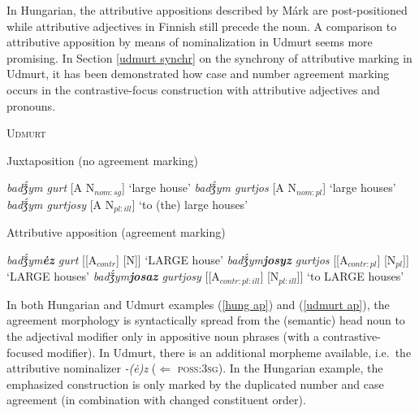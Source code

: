 {In Hungarian, the attributive appositions described by Márk are post-positioned while attributive adjectives in Finnish still precede the noun. A comparison to attributive apposition by means of nominalization in Udmurt seems more promising. In Section \ref{udmurt synchr} on the synchrony of attributive marking in Udmurt, it has been demonstrated how case and number agreement marking occurs in the contrastive-focus construction with attributive adjectives and pronouns.
\begin{exe}
\ex \textsc{Udmurt} \citep{winkler2001} \label{udmurt ap}
\begin{xlist}
\ex 	Juxtaposition (no agreement marking)
\begin{xlist}
\ex	\textit{badǯ́ym gurt} [A N$_{nom:sg}$] ‘large house’
\ex	\textit{badǯ́ym gurtjos} [A N$_{nom:pl}$] ‘large houses’
\ex	\textit{badǯ́ym gurtjosy} [A N$_{pl:ill}$] ‘to (the) large houses’
\end{xlist}
\ex	Attributive apposition (agreement marking)
\begin{xlist}
\ex	\textit{badǯ́ym\textbf{ėz} gurt} [[A$_{contr}$] [N]] ‘LARGE house’
\ex	\textit{badǯ́ym\textbf{josyz} gurtjos} [[A$_{contr:pl}$] [N$_{pl}$]] ‘LARGE houses’
\ex	\textit{badǯ́ym\textbf{josaz} gurtjosy} [[A$_{contr:pl:ill}$] [N$_{pl:ill}$]] ‘to LARGE houses’
\end{xlist}
\end{xlist}
\end{exe}
In both Hungarian and Udmurt examples (\ref{hung ap}) and (\ref{udmurt ap}), the agreement morphology is syntactically spread from the (semantic) head noun to the adjectival modifier only in appositive noun phrases (with a contrastive-focused modifier). In Udmurt, there is an additional morpheme available, i.e.~the attributive nominalizer \textit{-(ė)z} ($\Leftarrow$ \textsc{poss:3sg}). In the Hungarian example, the emphasized construction is only marked by the duplicated number and case agreement (in combination with changed constituent order).

}
